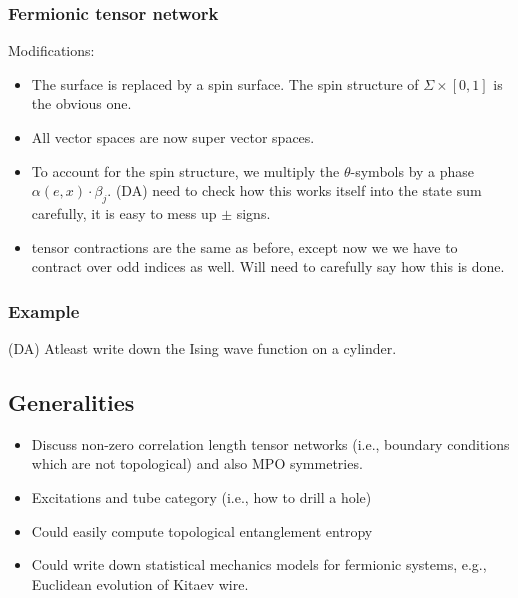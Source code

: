 \documentclass[12pt,a4paper]{article}
\newcommand{\dave}[1]{{\color{ao(english)}\footnotesize{(DA) #1}}}
\begin{document}
\subsubsection{Fermionic tensor network}
Modifications: 
\begin{itemize} 
\item The surface is replaced by a spin surface.
The spin structure of $\Sigma \times [0,1]$ is the obvious one.
\item All vector spaces are now super vector spaces. 
\item To account for the spin structure, we multiply the $\theta$-symbols by a phase $ \alpha(e,x) \cdot \beta_j$. 
\dave{need to check how this works itself into the state sum carefully, it is easy to mess up $\pm$ signs.}
\item tensor contractions are the same as before, except now we we have to contract over odd indices as well. 
Will need to carefully say how this is done. 
\end{itemize}

\subsubsection{Example}
\dave{Atleast write down the Ising wave function on a cylinder.}

\subsection{Generalities}
\begin{itemize}
\item Discuss non-zero correlation length tensor networks (i.e., boundary conditions which are not topological) and also MPO symmetries.
\item Excitations and tube category (i.e., how to drill a hole)
\item Could easily compute topological entanglement entropy
\item Could write down statistical mechanics models for fermionic systems, e.g., Euclidean evolution of Kitaev wire. 
\end{itemize}
\end{document}
